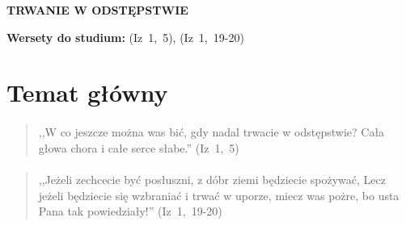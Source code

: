 \documentclass[10pt,a4paper,oneside]{article}
\begin{document}
\centerline{\textbf{\MakeUppercase{Trwanie w odstępstwie}}}
\begin{center}
\textbf{Wersety do studium:} \mbox{(Iz 1, 5)}, \mbox{(Iz 1, 19-20)}
\end{center}
\section{Temat główny}
\paragraph{}
\begin{quote}
,,W co jeszcze można was bić, gdy nadal trwacie w odstępstwie? Cała głowa chora i całe serce słabe.'' \mbox{(Iz 1, 5)}
\end{quote}
\paragraph{}
\begin{quote}
,,Jeżeli zechcecie być posłuszni, z dóbr ziemi będziecie spożywać, Lecz jeżeli będziecie się wzbraniać i trwać w uporze, miecz was pożre, bo usta Pana tak powiedziały!'' \mbox{(Iz 1, 19-20)}
\end{quote}
\end{document}
